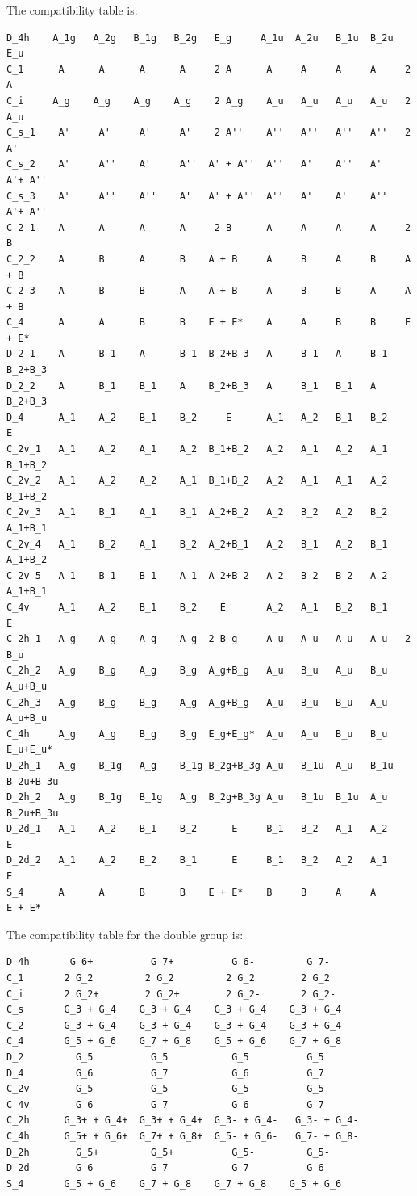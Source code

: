 \documentclass[12pt,a4paper]{article}
\begin{document}
The compatibility table is:
\begin{verbatim}
D_4h    A_1g   A_2g   B_1g   B_2g   E_g     A_1u  A_2u   B_1u  B_2u  E_u
C_1      A      A      A      A     2 A      A     A     A     A     2 A
C_i     A_g    A_g    A_g    A_g    2 A_g    A_u   A_u   A_u   A_u   2 A_u
C_s_1    A'     A'     A'     A'    2 A''    A''   A''   A''   A''   2 A'
C_s_2    A'     A''    A'     A''  A' + A''  A''   A'    A''   A'    A'+ A''
C_s_3    A'     A''    A''    A'   A' + A''  A''   A'    A'    A''   A'+ A''
C_2_1    A      A      A      A     2 B      A     A     A     A     2 B
C_2_2    A      B      A      B    A + B     A     B     A     B     A + B 
C_2_3    A      B      B      A    A + B     A     B     B     A     A + B
C_4      A      A      B      B    E + E*    A     A     B     B     E + E*    
D_2_1    A      B_1    A      B_1  B_2+B_3   A     B_1   A     B_1   B_2+B_3
D_2_2    A      B_1    B_1    A    B_2+B_3   A     B_1   B_1   A     B_2+B_3
D_4      A_1    A_2    B_1    B_2     E      A_1   A_2   B_1   B_2     E 
C_2v_1   A_1    A_2    A_1    A_2  B_1+B_2   A_2   A_1   A_2   A_1   B_1+B_2
C_2v_2   A_1    A_2    A_2    A_1  B_1+B_2   A_2   A_1   A_1   A_2   B_1+B_2
C_2v_3   A_1    B_1    A_1    B_1  A_2+B_2   A_2   B_2   A_2   B_2   A_1+B_1
C_2v_4   A_1    B_2    A_1    B_2  A_2+B_1   A_2   B_1   A_2   B_1   A_1+B_2
C_2v_5   A_1    B_1    B_1    A_1  A_2+B_2   A_2   B_2   B_2   A_2   A_1+B_1
C_4v     A_1    A_2    B_1    B_2    E       A_2   A_1   B_2   B_1     E
C_2h_1   A_g    A_g    A_g    A_g  2 B_g     A_u   A_u   A_u   A_u   2 B_u
C_2h_2   A_g    B_g    A_g    B_g  A_g+B_g   A_u   B_u   A_u   B_u   A_u+B_u
C_2h_3   A_g    B_g    B_g    A_g  A_g+B_g   A_u   B_u   B_u   A_u   A_u+B_u
C_4h     A_g    A_g    B_g    B_g  E_g+E_g*  A_u   A_u   B_u   B_u   E_u+E_u*
D_2h_1   A_g    B_1g   A_g    B_1g B_2g+B_3g A_u   B_1u  A_u   B_1u  B_2u+B_3u
D_2h_2   A_g    B_1g   B_1g   A_g  B_2g+B_3g A_u   B_1u  B_1u  A_u   B_2u+B_3u
D_2d_1   A_1    A_2    B_1    B_2      E     B_1   B_2   A_1   A_2      E  
D_2d_2   A_1    A_2    B_2    B_1      E     B_1   B_2   A_2   A_1      E
S_4      A      A      B      B    E + E*    B     B     A     A      E + E* 
\end{verbatim}
The compatibility table for the double group is:
\begin{verbatim}
D_4h       G_6+          G_7+          G_6-         G_7-
C_1       2 G_2         2 G_2         2 G_2        2 G_2
C_i       2 G_2+        2 G_2+        2 G_2-       2 G_2-
C_s       G_3 + G_4    G_3 + G_4    G_3 + G_4    G_3 + G_4
C_2       G_3 + G_4    G_3 + G_4    G_3 + G_4    G_3 + G_4
C_4       G_5 + G_6    G_7 + G_8    G_5 + G_6    G_7 + G_8
D_2         G_5          G_5           G_5          G_5
D_4         G_6          G_7           G_6          G_7
C_2v        G_5          G_5           G_5          G_5
C_4v        G_6          G_7           G_6          G_7
C_2h      G_3+ + G_4+  G_3+ + G_4+  G_3- + G_4-   G_3- + G_4-
C_4h      G_5+ + G_6+  G_7+ + G_8+  G_5- + G_6-   G_7- + G_8-
D_2h        G_5+         G_5+          G_5-         G_5-
D_2d        G_6          G_7           G_7          G_6
S_4       G_5 + G_6    G_7 + G_8    G_7 + G_8    G_5 + G_6
\end{verbatim}
\end{document}
